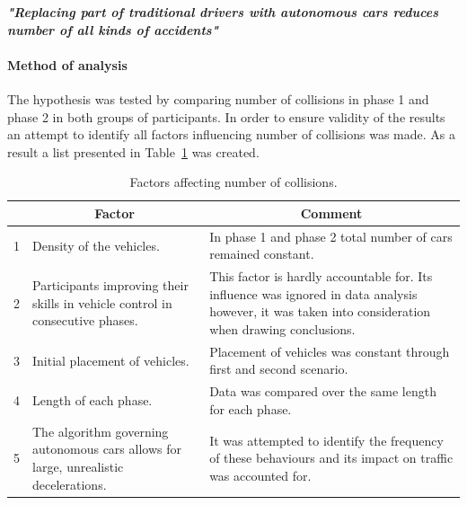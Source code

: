 \documentclass[11pt,english]{article}
\begin{document}
\textbf{\textit{"Replacing part of traditional drivers with autonomous cars reduces number of all kinds of accidents"}}

\paragraph{Method of analysis}

The hypothesis was tested by comparing number of collisions in phase 1 and phase 2 in both groups of participants. In order to ensure validity of the results an attempt to identify all factors influencing number of collisions was made. As a result a list presented in Table~\ref{table:hypothesis1} was created.


\begin{table}[]
\centering
\begin{tabular}{|c|p{6.2cm}|p{6.2cm}|}
\hline
\textbf{} & \multicolumn{1}{c|}{\textbf{Factor}}                                                 & \multicolumn{1}{c|}{\textbf{Comment}}                                                                                                                \\ \hline
1         & Density of the vehicles.                                                             & In phase 1 and phase 2 total number of cars remained constant.                                                                                       \\ \hline
2         & Participants improving their skills in vehicle control in consecutive phases.        & This factor is hardly accountable for. Its influence was ignored in data analysis however, it was taken into consideration when drawing conclusions. \\ \hline
3         & Initial placement of vehicles.                                                       & Placement of vehicles was constant through first and second scenario.                                                                                \\ \hline
4         & Length of each phase.                                                                & Data was compared over the same length for each phase.                                                                                               \\ \hline
5         & The algorithm governing autonomous cars allows for large, unrealistic decelerations. & It was attempted to identify the frequency of these behaviours and its impact on traffic was accounted for.                                          \\ \hline
\end{tabular}
\caption{Factors affecting number of collisions.}
\label{table:hypothesis1}
\end{table}
\end{document}
